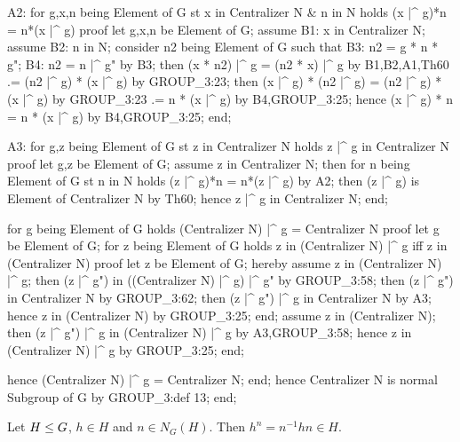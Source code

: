   A2: for g,x,n being Element of G st x in Centralizer N & n in N
  holds (x |^ g)*n = n*(x |^ g)
  proof
    let g,x,n be Element of G;
    assume B1: x in Centralizer N;
    assume B2: n in N;
    consider n2 being Element of G such that
    B3: n2 = g * n * g";
    B4: n2 = n |^ g" by B3;
    then (x * n2) |^ g = (n2 * x) |^ g by B1,B2,A1,Th60
                      .= (n2 |^ g) * (x |^ g) by GROUP_3:23;
    then (x |^ g) * (n2 |^ g) = (n2 |^ g) * (x |^ g) by GROUP_3:23
                             .= n * (x |^ g) by B4,GROUP_3:25;
    hence (x |^ g) * n = n * (x |^ g) by B4,GROUP_3:25;
  end;

  A3: for g,z being Element of G st z in Centralizer N
  holds z |^ g in Centralizer N
  proof
    let g,z be Element of G;
    assume z in Centralizer N;
    then for n being Element of G st n in N holds
    (z |^ g)*n = n*(z |^ g) by A2;
    then (z |^ g) is Element of Centralizer N by Th60;
    hence z |^ g in Centralizer N;
  end;


  for g being Element of G holds (Centralizer N) |^ g = Centralizer N
  proof
    let g be Element of G;
    for z being Element of G
    holds z in (Centralizer N) |^ g iff z in (Centralizer N)
    proof
      let z be Element of G;
      hereby
        assume z in (Centralizer N) |^ g;
        then (z |^ g") in ((Centralizer N) |^ g) |^ g" by GROUP_3:58;
        then (z |^ g") in Centralizer N by GROUP_3:62;
        then (z |^ g") |^ g in Centralizer N by A3;
        hence z in (Centralizer N) by GROUP_3:25;
      end;
      assume z in (Centralizer N);
      then (z |^ g") |^ g in (Centralizer N) |^ g by A3,GROUP_3:58;
      hence z in (Centralizer N) |^ g by GROUP_3:25;
    end;

    hence (Centralizer N) |^ g = Centralizer N;
  end;
  hence Centralizer N is normal Subgroup of G by GROUP_3:def 13;
end;
\eatline
{}\nwendcode{}\nwdocspar
\begin{theorem}
Let $H\leq G$, $h\in H$ and $n\in N_{G}(H)$. Then
$h^{n}=n^{-1}hn\in H$.
\end{theorem}

